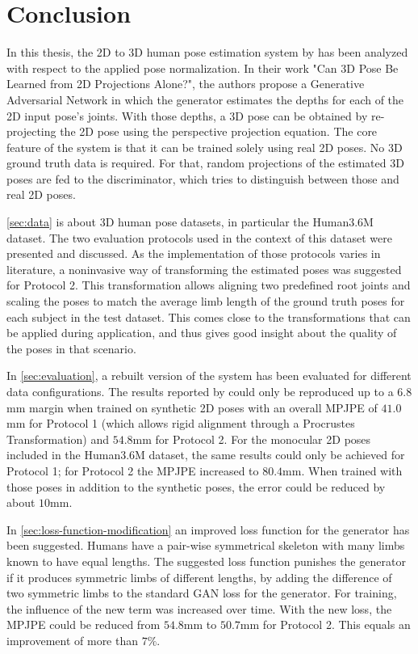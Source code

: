 \section{Conclusion}
\label{sec:conclusion}
In this thesis, the 2D to 3D human pose estimation system by \citet{drover18} has been analyzed with respect to the applied pose normalization.
In their work "Can 3D Pose Be Learned from 2D Projections Alone?", the authors propose a Generative Adversarial Network in which the generator estimates the depths for each of the 2D input pose's joints.
With those depths, a 3D pose can be obtained by re-projecting the 2D pose using the perspective projection equation.
The core feature of the system is that it can be trained solely using real 2D poses.
No 3D ground truth data is required.
For that, random projections of the estimated 3D poses are fed to the discriminator, which tries to distinguish between those and real 2D poses.

\autoref{sec:data} is about 3D human pose datasets, in particular the Human3.6M \cite{ionescu14} dataset.
The two evaluation protocols used in the context of this dataset were presented and discussed.
As the implementation of those protocols varies in literature, a noninvasive way of transforming the estimated poses was suggested for Protocol 2.
This transformation allows aligning two predefined root joints and scaling the poses to match the average limb length of the ground truth poses for each subject in the test dataset.
This comes close to the transformations that can be applied during application, and thus gives good insight about the quality of the poses in that scenario.

In \autoref{sec:evaluation}, a rebuilt version of the system has been evaluated for different data configurations.
The results reported by \citet{drover18} could only be reproduced up to a $6.8$mm margin when trained on synthetic 2D poses with an overall MPJPE of $41.0$mm for Protocol 1 (which allows rigid alignment through a Procrustes Transformation) and $54.8$mm for Protocol 2.
For the monocular 2D poses included in the Human3.6M dataset, the same results could only be achieved for Protocol 1; for Protocol 2 the MPJPE increased to $80.4$mm.
When trained with those poses in addition to the synthetic poses, the error could be reduced by about $10$mm.

In \autoref{sec:loss-function-modification} an improved loss function for the generator has been suggested.
Humans have a pair-wise symmetrical skeleton with many limbs known to have equal lengths.
The suggested loss function punishes the generator if it produces symmetric limbs of different lengths, by adding the difference of two symmetric limbs to the standard GAN loss for the generator.
For training, the influence of the new term was increased over time.
With the new loss, the MPJPE could be reduced from $54.8$mm to $50.7$mm for Protocol 2.
This equals an improvement of more than $7\%$.

